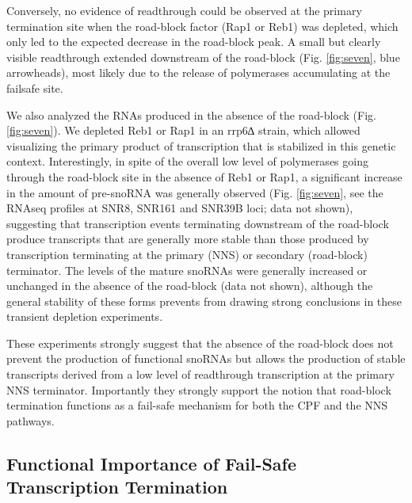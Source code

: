 Conversely, no evidence of readthrough could be observed at the primary termination site when the road-block factor (Rap1 or Reb1) was depleted, which only led to the expected decrease in the road-block peak.  A small but clearly visible readthrough extended downstream of the road-block (Fig. \ref{fig:seven}, blue arrowheads), most likely due to the release of polymerases accumulating at the failsafe site.   

We also analyzed the RNAs produced in the absence of the road-block (Fig. \ref{fig:seven}). We depleted Reb1 or Rap1 in an rrp6∆ strain, which allowed visualizing the primary product of transcription that is stabilized in this genetic context. Interestingly, in spite of the overall low level of polymerases going through the road-block site in the absence of Reb1 or Rap1, a significant increase in the amount of pre-snoRNA was generally observed (Fig. \ref{fig:seven}, see the RNAseq profiles at SNR8, SNR161 and SNR39B loci; data not shown), suggesting that transcription events terminating downstream of the road-block produce transcripts that are generally more stable than those produced by transcription terminating at the primary (NNS) or secondary (road-block) terminator. The levels of the mature snoRNAs were generally increased or unchanged in the absence of the road-block (data not shown), although the general stability of these forms prevents from drawing strong conclusions in these transient depletion experiments.  

These experiments strongly suggest that the absence of the road-block does not prevent the production of functional snoRNAs but allows the production of stable transcripts derived from a low level of readthrough transcription at the primary NNS terminator. Importantly they strongly support the notion that road-block termination functions as a fail-safe mechanism for both the CPF and the NNS pathways.


\singlespacing
\subsection*{Functional Importance of Fail-Safe Transcription Termination }
\doublespacing

